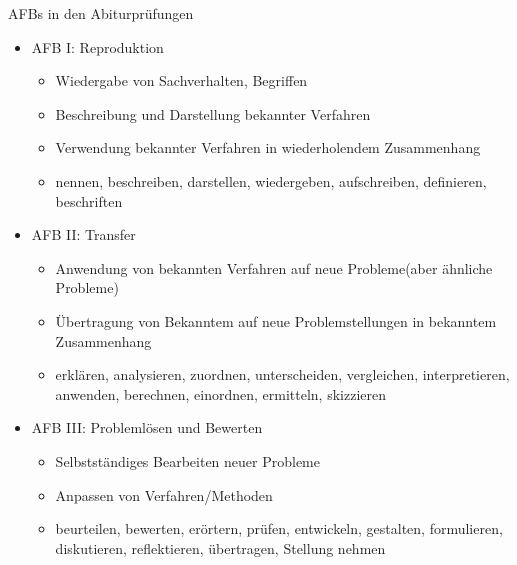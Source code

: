 \documentclass{article}
\begin{document}
\begin{block}{AFBs in den Abiturprüfungen}
    \begin{itemize}
        \item AFB I: Reproduktion
        \begin{itemize}
            \item Wiedergabe von Sachverhalten, Begriffen
            \item Beschreibung und Darstellung bekannter Verfahren
            \item Verwendung bekannter Verfahren in wiederholendem Zusammenhang
            \item nennen, beschreiben, darstellen, wiedergeben, aufschreiben, definieren, beschriften
        \end{itemize}
        \item AFB II: Transfer
        \begin{itemize}
            \item Anwendung von bekannten Verfahren auf neue Probleme(aber ähnliche Probleme)
            \item Übertragung von Bekanntem auf neue Problemstellungen in bekanntem Zusammenhang
            \item erklären, analysieren, zuordnen, unterscheiden, vergleichen, interpretieren, anwenden, berechnen, einordnen, ermitteln, skizzieren
        \end{itemize}
        \item AFB III: Problemlösen und Bewerten
        \begin{itemize}
            \item Selbstständiges Bearbeiten neuer Probleme
            \item Anpassen von Verfahren/Methoden
            \item beurteilen, bewerten, erörtern, prüfen, entwickeln, gestalten, formulieren, diskutieren, reflektieren, übertragen, Stellung nehmen
        \end{itemize}
    \end{itemize}
\end{block}
\end{document}
